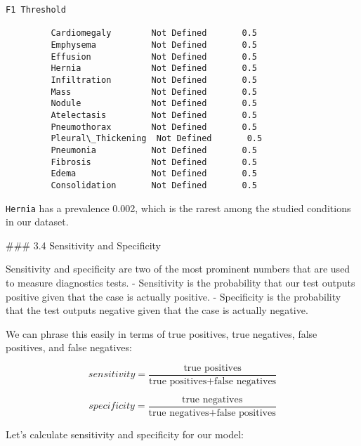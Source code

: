 \documentclass[11pt]{article}
\begin{document}
\begin{Verbatim}[commandchars=\\\{\}]
                                      F1 Threshold  
                                                    
         Cardiomegaly        Not Defined       0.5  
         Emphysema           Not Defined       0.5  
         Effusion            Not Defined       0.5  
         Hernia              Not Defined       0.5  
         Infiltration        Not Defined       0.5  
         Mass                Not Defined       0.5  
         Nodule              Not Defined       0.5  
         Atelectasis         Not Defined       0.5  
         Pneumothorax        Not Defined       0.5  
         Pleural\_Thickening  Not Defined       0.5  
         Pneumonia           Not Defined       0.5  
         Fibrosis            Not Defined       0.5  
         Edema               Not Defined       0.5  
         Consolidation       Not Defined       0.5  
\end{Verbatim}
            
    \texttt{Hernia} has a prevalence 0.002, which is the rarest among the
studied conditions in our dataset.

     \#\#\# 3.4 Sensitivity and Specificity

Sensitivity and specificity are two of the most prominent numbers that
are used to measure diagnostics tests. - Sensitivity is the probability
that our test outputs positive given that the case is actually positive.
- Specificity is the probability that the test outputs negative given
that the case is actually negative.

We can phrase this easily in terms of true positives, true negatives,
false positives, and false negatives:

\[sensitivity = \frac{\text{true positives}}{\text{true positives} + \text{false negatives}}\]

\[specificity = \frac{\text{true negatives}}{\text{true negatives} + \text{false positives}}\]

Let's calculate sensitivity and specificity for our model:
\end{document}
